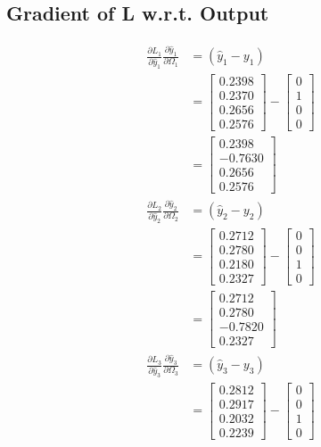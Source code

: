 \documentclass{article}
\begin{document}
\subsection{Gradient of L w.r.t. Output}
\begin{align*}
\frac{\partial L_1}{\partial \hat{y}_1}\frac{\partial \hat{y}_1}{\partial \Omega_1} &= (\hat{y}_{1}-y_{1})\\
&= \begin{bmatrix} 0.2398 \\ 0.2370 \\ 0.2656 \\ 0.2576 \end{bmatrix} - \begin{bmatrix} 0 \\ 1 \\ 0 \\ 0 \end{bmatrix} \\
&=\begin{bmatrix} 0.2398 \\ -0.7630 \\ 0.2656 \\ 0.2576 \end{bmatrix}  \\
\frac{\partial L_2}{\partial \hat{y}_2}\frac{\partial \hat{y}_2}{\partial \Omega_2} &= (\hat{y}_{2}-y_{2})\\
&= \begin{bmatrix} 0.2712 \\ 0.2780 \\ 0.2180 \\ 0.2327 \end{bmatrix} - \begin{bmatrix} 0 \\ 0 \\ 1 \\ 0 \end{bmatrix}\\
&= \begin{bmatrix} 0.2712 \\ 0.2780 \\ -0.7820 \\ 0.2327 \end{bmatrix} \\
\frac{\partial L_3}{\partial \hat{y}_3}\frac{\partial \hat{y}_3}{\partial \Omega_3} &= (\hat{y}_{3}-y_{3})\\
&= \begin{bmatrix} 0.2812 \\ 0.2917 \\ 0.2032 \\ 0.2239 \end{bmatrix} - \begin{bmatrix} 0 \\ 0 \\ 1 \\ 0 \end{bmatrix}\\

\end{align*}
\end{document}

